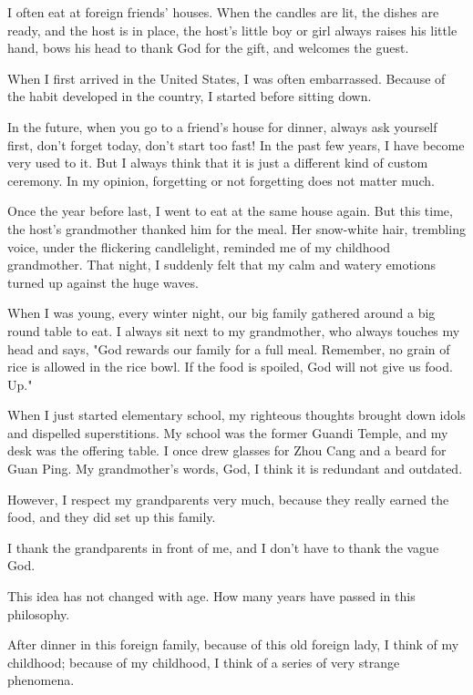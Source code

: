 
\begin{acknowledgement*}

I often eat at foreign friends' houses. When the candles are lit, the dishes are ready, and the host is in place, the host’s little boy or girl always raises his little hand, bows his head to thank God for the gift, and welcomes the guest.

When I first arrived in the United States, I was often embarrassed. Because of the habit developed in the country, I started before sitting down.

In the future, when you go to a friend's house for dinner, always ask yourself first, don't forget today, don't start too fast! In the past few years, I have become very used to it. But I always think that it is just a different kind of custom ceremony. In my opinion, forgetting or not forgetting does not matter much.

Once the year before last, I went to eat at the same house again. But this time, the host’s grandmother thanked him for the meal. Her snow-white hair, trembling voice, under the flickering candlelight, reminded me of my childhood grandmother. That night, I suddenly felt that my calm and watery emotions turned up against the huge waves.

When I was young, every winter night, our big family gathered around a big round table to eat. I always sit next to my grandmother, who always touches my head and says, "God rewards our family for a full meal. Remember, no grain of rice is allowed in the rice bowl. If the food is spoiled, God will not give us food. Up."

When I just started elementary school, my righteous thoughts brought down idols and dispelled superstitions. My school was the former Guandi Temple, and my desk was the offering table. I once drew glasses for Zhou Cang and a beard for Guan Ping. My grandmother's words, God, I think it is redundant and outdated.

However, I respect my grandparents very much, because they really earned the food, and they did set up this family.

I thank the grandparents in front of me, and I don't have to thank the vague God.

This idea has not changed with age. How many years have passed in this philosophy.

After dinner in this foreign family, because of this old foreign lady, I think of my childhood; because of my childhood, I think of a series of very strange phenomena.


\end{acknowledgement*}
